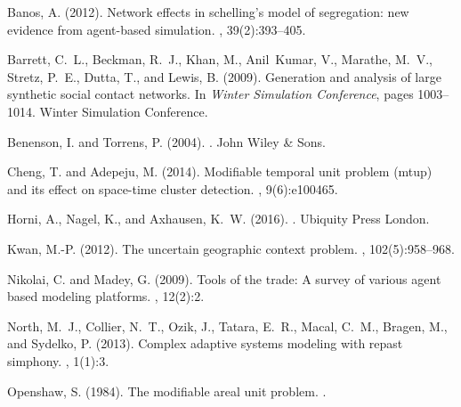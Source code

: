 \documentclass[11pt]{article}
\begin{document}
\begin{thebibliography}{}

Banos, A. (2012).
\newblock Network effects in schelling's model of segregation: new evidence
  from agent-based simulation.
,
  39(2):393--405.

Barrett, C.~L., Beckman, R.~J., Khan, M., Anil~Kumar, V., Marathe, M.~V.,
  Stretz, P.~E., Dutta, T., and Lewis, B. (2009).
\newblock Generation and analysis of large synthetic social contact networks.
\newblock In {\em Winter Simulation Conference}, pages 1003--1014. Winter
  Simulation Conference.

Benenson, I. and Torrens, P. (2004).
.
\newblock John Wiley \& Sons.

Cheng, T. and Adepeju, M. (2014).
\newblock Modifiable temporal unit problem (mtup) and its effect on space-time
  cluster detection.
, 9(6):e100465.

Horni, A., Nagel, K., and Axhausen, K.~W. (2016).
.
\newblock Ubiquity Press London.

Kwan, M.-P. (2012).
\newblock The uncertain geographic context problem.
,
  102(5):958--968.

Nikolai, C. and Madey, G. (2009).
\newblock Tools of the trade: A survey of various agent based modeling
  platforms.
, 12(2):2.

North, M.~J., Collier, N.~T., Ozik, J., Tatara, E.~R., Macal, C.~M., Bragen,
  M., and Sydelko, P. (2013).
\newblock Complex adaptive systems modeling with repast simphony.
, 1(1):3.

Openshaw, S. (1984).
\newblock The modifiable areal unit problem.
.


\end{thebibliography}
\end{document}
